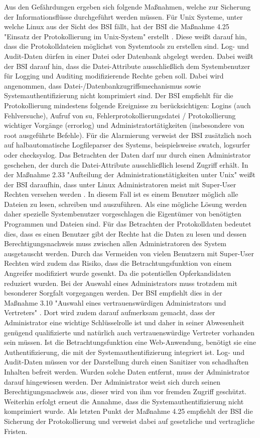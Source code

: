 \documentclass[11pt,a4paper]{report}
\begin{document}
Aus den Gefährdungen ergeben sich folgende Maßnahmen, welche zur Sicherung der Informationsflüsse durchgeführt werden müssen. Für Unix Systeme, unter welche Linux aus der Sicht des BSI fällt, hat der BSI die Maßnahme 4.25 "Einsatz der Protokollierung im Unix-System" erstellt \cite{bsi_m4025}. Diese weißt darauf hin, dass die Protokolldateien möglichst von Systemtools zu erstellen sind. Log- und Audit-Daten dürfen in einer Datei oder Datenbank abgelegt werden. Dabei weißt der BSI darauf hin, dass die Datei-Attribute ausschließlich dem Systembenutzer für Logging und Auditing modifizierende Rechte geben soll. Dabei wird angenommen, dass Datei-/Datenbankzugriffsmechanismus sowie Systemauthentifizierung nicht komprimiert sind. Der BSI empfiehlt für die Protokollierung mindestens folgende Ereignisse zu berücksichtigen: Logins (auch Fehlversuche), Aufruf von su, Fehlerprotokollierungsdatei / Protokollierung wichtiger Vorgänge (errorlog) und Administratortätigkeiten (insbesondere von root ausgeführte Befehle). Für die Alarmierung verweist der BSI zusätzlich noch auf halbautomatische Logfileparser des Systems, beispielsweise swatch, logsurfer oder checksyslog. Das Betrachten der Daten darf nur durch einen Administrator geschehen, der durch die Datei-Attribute ausschließlich lesend Zugriff erhält. In der Maßnahme 2.33 "Aufteilung der Administrationstätigkeiten unter Unix" weißt der BSI daraufhin, dass unter Linux Administratoren meist mit Super-User Rechten versehen werden \cite{bsi_m2033}. In diesem Fall ist es einem Benutzer möglich alle Dateien zu lesen, schreiben und auszuführen. Als eine mögliche Lösung werden daher spezielle Systembenutzer vorgeschlagen die Eigentümer von benötigten Programmen und Dateien sind. Für das Betrachten der Protokolldaten bedeutet dies, dass es einen Benutzer gibt der Rechte hat die Daten zu lesen und dessen Berechtigungsnachweis muss zwischen allen Administratoren des System ausgetauscht werden. Durch das Vermeiden von vielen Benutzern mit Super-User Rechten wird zudem das Risiko, dass die Betrachtungsfunktion von einem Angreifer modifiziert wurde gesenkt. Da die potentiellen Opferkandidaten reduziert wurden. Bei der Auswahl eines Administrators muss trotzdem mit besonderer Sorgfalt vorgegangen werden. Der BSI empfiehlt dies in der Maßnahme 3.10 "Auswahl eines vertrauenswürdigen Administrators und Vertreters" \cite{bsi_m3010}. Dort wird zudem darauf aufmerksam gemacht, dass der Administrator eine wichtige Schlüsselrolle ist und daher in seiner Abwesenheit genügend qualifizierte und natürlich auch vertrauenswürdige Vertreter vorhanden sein müssen. Ist die Betrachtungsfunktion eine Web-Anwendung, benötigt sie eine Authentifizierung, die mit der Systemauthentifizierung integriert ist. Log- und Audit-Daten müssen vor der Darstellung durch einen Sanitizer von schadhaften Inhalten befreit werden. Wurden solche Daten entfernt, muss der Administrator darauf hingewiesen werden. Der Administrator weist sich durch seinen Berechtigungsnachweis aus, dieser wird von ihm vor fremden Zugriff geschützt. Weiterhin erfolgt erneut die Annahme, dass die Systemauthentifizierung nicht komprimiert wurde. Als letzten Punkt der Maßnahme 4.25 empfiehlt der BSI die Sicherung der Protokollierung und verweist dabei auf gesetzliche und vertragliche Fristen.
\end{document}
